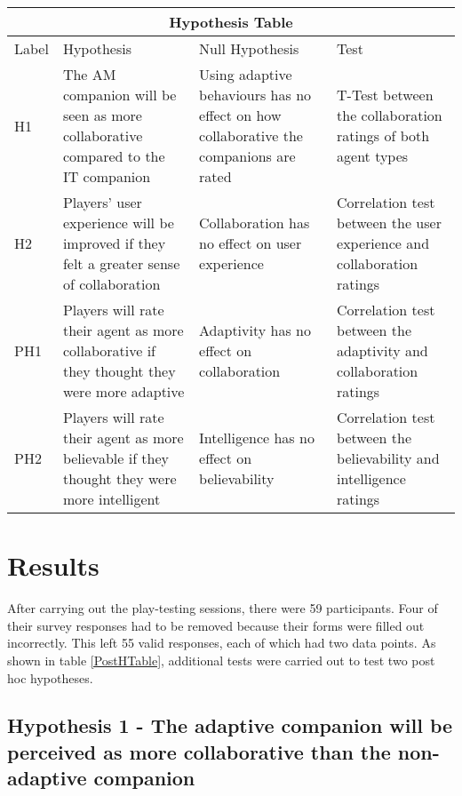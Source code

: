 \documentclass{IEEEtran}
\begin{document}
\begin{table*}[t]\centering
\begin{tabular}{ |p{0.5cm}|p{6cm}|p{6cm}|p{5cm}|  }
 \hline
 \multicolumn{4}{|c|}{Hypothesis Table} \\
 \hline
 Label & Hypothesis & Null Hypothesis & Test\\
 \hline
    H1 & The AM companion will be seen as more collaborative compared to the IT companion & 
    Using adaptive behaviours has no effect on how collaborative the companions are rated &
    T-Test between the collaboration ratings of both agent types \\
 \hline
    H2 & Players' user experience will be improved if they felt a greater sense of collaboration & 
    Collaboration has no effect on user experience &
    Correlation test between the user experience and collaboration ratings\\
 \hline
    PH1 & Players will rate their agent as more collaborative if they thought they were more adaptive & 
    Adaptivity has no effect on collaboration &
    Correlation test between the adaptivity and collaboration ratings\\
 \hline
    PH2 & Players will rate their agent as more believable if they thought they were more intelligent & 
    Intelligence has no effect on believability &
    Correlation test between the believability and intelligence ratings\\
 \hline
\end{tabular}
\caption{Updated Hypothesis Table}
\label{PostHTable}
\end{table*}

\newpage

\section{Results}
\label{Results}


After carrying out the play-testing sessions, there were 59 participants. Four of their survey responses had to be removed because their forms were filled out incorrectly. This left 55 valid responses, each of which had two data points. As shown in table \ref{PostHTable}, additional tests were carried out to test two post hoc hypotheses.


\subsection{Hypothesis 1 - The adaptive companion will be perceived as more collaborative than the non-adaptive companion}
\end{document}
